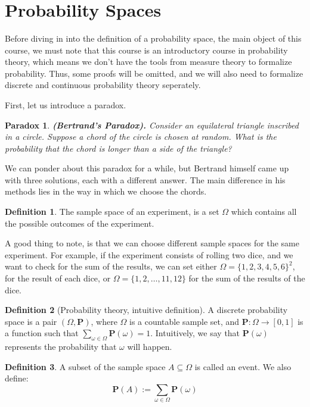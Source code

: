 \documentclass[11pt,a4paper]{article}
\title{\textbf{}}
\author{}
\date{}
\theoremstyle{definition}
\newtheorem{definition}{Definition}[section]
\theoremstyle{plain}
\newtheorem{paradox}{Paradox}[section]
\renewcommand{\tt}[1]{\textnormal{\textbf{(#1).}}} %
\begin{document}
	\maketitle
	\newpage
  \section{Probability Spaces}
  Before diving in into the definition of a probability space, the main object
  of this course, we must note that this course is an introductory course in 
  probability theory, which means we don't have the tools from measure theory
  to formalize probability. Thus, some proofs will be omitted, and we will
  also need to formalize discrete and continuous probability theory seperately.

  First, let us introduce a paradox.
  \begin{paradox}
    \tt{Bertrand's Paradox}
    Consider an equilateral triangle inscribed in a circle. 
    Suppose a chord of the circle is chosen at random. 
    What is the probability that the chord is longer than a side of the 
    triangle? 
  \end{paradox}

  We can ponder about this paradox for a while, but Bertrand himself came up
  with three solutions, each with a different answer. The main difference in
  his methods lies in the way in which we choose the chords.

  \begin{definition}
    The sample space of an experiment, is a set $\Omega$ which contains all
    the possible outcomes of the experiment.
  \end{definition}

  A good thing to note, is that we can choose different sample spaces for the
  same experiment. For example, if the experiment consists of rolling two
  dice, and we want to check for the sum of the results, we can set either
  $\Omega = \{1,2,3,4,5,6\}^2$, for the result of each dice, or 
  $\Omega = \{1,2,\dots,11,12\}$ for the sum of the results of the dice. 

  \begin{definition}[Probability theory, intuitive definition]
    A discrete probability space is a pair $(\Omega, \mathbf P)$, where
    $\Omega$ is a countable sample set, and $\mathbf P \colon \Omega \to 
    [0,1]$ is a function such that 
    $\sum_{\omega \in \Omega}{\mathbf P(\omega)} = 1$. 
    Intuitively, we say that $\mathbf P(\omega)$ represents the probability
    that $\omega$ will happen.
  \end{definition}
  \begin{definition}
    A subset of the sample space $A \subseteq \Omega$ is called an event.
    We also define:
    \[
      \mathbf P(A) := \sum_{\omega \in \Omega}{\mathbf P(\omega)}
    \]
  \end{definition}
  
\end{document}
